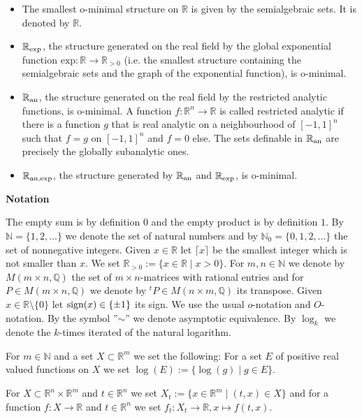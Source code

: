 \documentclass[12pt]{article}
\def\vs{\vspace}
\def\exp{\mathrm{exp}}
\begin{document}
\begin{itemize}
	\item [(1)] The smallest o-minimal structure on $\mathbb{R}$ is given by the semialgebraic sets. It is denoted by $\mathbb{R}$.
	\item [(2)] $\mathbb{R}_{\textnormal{exp}}$, the structure generated on the real field by the global exponential function $\exp:\mathbb{R} \to \mathbb{R}_{>0}$ (i.e. the smallest structure containing the semialgebraic sets and the graph of the exponential function), is o-minimal.
	\item [(3)] $\mathbb{R}_{\textnormal{an}}$, the structure generated on the real field by the restricted analytic functions, is o-minimal. A function $f:\mathbb{R}^n \to \mathbb{R}$ is called restricted analytic if there is a function $g$ that is real analytic on a neighbourhood of $[-1,1]^n$ such that $f=g$ on $[-1,1]^n$ and $f=0$ else. The sets definable in $\mathbb{R}_{\textnormal{an}}$ are precisely the globally subanalytic ones.
	\item [(4)] $\mathbb{R}_{\textnormal{an,exp}}$, the structure generated by $\mathbb{R}_{\textnormal{an}}$ and $\mathbb{R}_{\textnormal{exp}}$, is o-minimal.
\end{itemize}

\vs{0.2cm}
{\bf Notation}

\vs{0.1cm}
The empty sum is by definition $0$ and the empty product is by definition $1$. By $\mathbb{N}=\{1,2,...\}$ we denote the set of natural numbers and by $\mathbb{N}_0=\{0,1,2,...\}$ the set of nonnegative integers. Given $x \in \mathbb{R}$ let $\lceil{x}\rceil$ be the smallest integer which is not smaller than $x$. We set $\mathbb{R}_{>0}:=\{x \in \mathbb{R} \mid x > 0\}$. For $m,n \in \mathbb{N}$ we denote by $M(m \times n,\mathbb{Q})$ the set of $m \times n$-matrices with rational entries and for $P \in M(m \times n,\mathbb{Q})$ we denote by $^tP \in M(n \times m,\mathbb{Q})$ its transpose. Given $x \in \mathbb{R} \setminus \{0\}$ let $\textnormal{sign}(x) \in \{\pm 1\}$ its sign. We use the usual $o$-notation and $O$-notation. By the symbol ''$\sim$'' we denote asymptotic equivalence. By $\log_k$ we denote the $k$-times iterated of the natural logarithm.

\vs{0.1cm}
For $m \in \mathbb{N}$ and a set $X \subset \mathbb{R}^m$ we set the following: For a set $E$ of positive real valued functions on $X$ we set $\log(E):=\{\log(g) \mid g \in E\}$.

\vs{0.2cm}
For $X \subset \mathbb{R}^n \times \mathbb{R}^m$ and $t \in \mathbb{R}^n$ we set $X_t:=\{x \in \mathbb{R}^m \mid (t,x) \in X\}$ and for a function $f:X \to \mathbb{R}$ and $t \in \mathbb{R}^n$ we set $f_t:X_t \to \mathbb{R}, x \mapsto f(t,x)$. 
\end{document}
